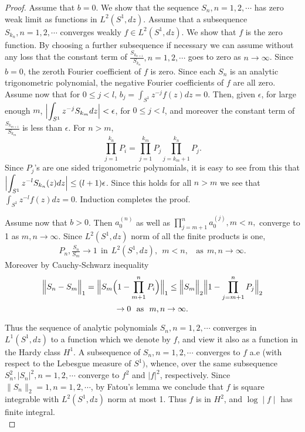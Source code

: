 \documentclass{amsart}
\theoremstyle{definition}
\theoremstyle{remark}
\numberwithin{equation}{section}
\newcommand{\1}{\mathbb{1}}
\begin{document}
\begin{proof}
 Assume that   $b =0 $. We show that the sequence $S_n, n=1,2,\cdots$ has zero
 weak limit as functions in  $L^2(S^1, dz)$. Assume that a subsequence $S_{k_n}, n=1,2,\cdots$ converges weakly
 $f \in L^2(S^1,dz)$. We show that $f$ is the zero function. By choosing a further subsequence if necessary we can assume without  any loss that the constant term of $\frac{S_{k_{n+1}}}{S_{k_n}}, n=1,2,\cdots$ goes to zero as $n\rightarrow \infty$.  Since $b=0$, the zeroth Fourier coefficient of $f$ is zero. Since each $S_n$ is an analytic
 trigonometric polynomial, the negative Fourier coefficients of $f$ are all zero.
 Assume now that for $0\leq  j < l$,  $\displaystyle b_j = \int_{S^1}z^{-j}f(z)dz =0$. Then, given $\epsilon$, for large enough $m$, $\displaystyle \Bigl| \int_{S^1} z^{-j}S_{k_m} dz \Bigr| < \epsilon$, for $0 \leq j< l$, and moreover the constant term of $\frac{S_{k_{m+1}}}{S_{k_m}}$
 is less than $\epsilon $. For $n > m$,
  $$\prod_{j=1}^{k_n}P_i = \prod_{j=1}^{k_m}P_j\prod_{j=k_m+1}^{k_n}P_j.$$
  Since $P_j$'s are one sided trigonometric polynomials, it is easy to see from this that $\displaystyle \Bigl| \int_{S^1}z^{-l}S_{k_n}(z)dz\Bigr| \leq (l+1)\epsilon$. Since this holds for all
  $n > m$ we see that $\displaystyle \int_{S^1}z^{-l}f(z)dz =0$. Induction completes the proof.

 Assume now that $b > 0$.
 Then $a_0^{(n)}$ as well as $ \prod_{j=m+1}^n a_0^{(j)}, m < n,$ converge to 1 as $m,n \rightarrow \infty$. Since $L^2(S^1, dz)$ norm of all the finite  products is one,
 \begin{eqnarray}
  P_n, \frac{S_n}{S_m} \rightarrow 1 {~~\textrm{in}}~~ L^2(S^1, dz),~~ m < n,~~  {~~\textrm{as}}~~ m,n \rightarrow \infty.
  \end{eqnarray}
   Moreover by Cauchy-Schwarz inequality
 $$\Bigl\| S_n - S_m\Bigr\|_1 = \Bigl\| S_m\Bigl(1 - \prod_{m+1}^nP_i\Bigr)\Bigr\|_1 \leq \Bigl\| S_m\Bigr\|_2 \Bigl\|1- \prod_{j=m+1}^nP_j\Bigr\|_2$$
$$\rightarrow 0 ~~{\rm{as}}~~ m, n \rightarrow \infty.$$

\noindent{}Thus the sequence of analytic polynomials $S_n, n=1,2,\cdots$ converges in $L^1(S^1, dz)$ to a function which we denote by $f$, and view it also as a function in the Hardy class $H^1$. A subsequence of $S_n, n=1,2,\cdots$ converges to $f$ a.e (with respect to the Lebesgue measure of $S^1)$, whence, over the same subsequence $S^2_n, |S_n|^2, n=1,2,\cdots$ converge to $f^2$ and
$|f|^2$, respectively. Since $\|S_n\|_2 =1, n =1,2,\cdots$, by Fatou's lemma we conclude
that $f$ is square integrable with $L^2(S^1, dz)$ norm at most 1. Thus $f$ is in $H^2$, and $\log \mid f\mid$ has finite integral.\\
\end{proof}
\end{document}
